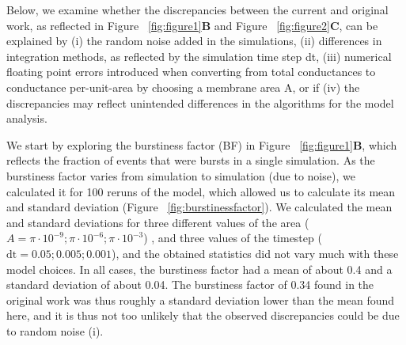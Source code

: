 \documentclass[10pt,a4paper,onecolumn]{article}
\begin{document}
Below, we examine whether the discrepancies between the current and
original work, as reflected in Figure ~\ref{fig:figure1}\textbf{B} and
Figure ~\ref{fig:figure2}\textbf{C}, can be explained by (i) the random
noise added in the simulations, (ii) differences in integration methods,
as reflected by the simulation time step dt, (iii) numerical floating
point errors introduced when converting from total conductances to
conductance per-unit-area by choosing a membrane area A, or if (iv) the
discrepancies may reflect unintended differences in the algorithms for
the model analysis.

We start by exploring the burstiness factor (BF) in Figure
~\ref{fig:figure1}\textbf{B}, which reflects the fraction of events that
were bursts in a single simulation. As the burstiness factor varies from
simulation to simulation (due to noise), we calculated it for 100 reruns
of the model, which allowed us to calculate its mean and standard
deviation (Figure ~\ref{fig:burstinessfactor}). We calculated the mean
and standard deviations for three different values of the area
(\(A = \pi\cdot 10^{-9}; \pi \cdot 10^{-6}; \pi \cdot 10^{-3}\)) , and
three values of the timestep (\(\mathrm{dt} = 0.05; 0.005; 0.001\)), and
the obtained statistics did not vary much with these model choices. In
all cases, the burstiness factor had a mean of about 0.4 and a standard
deviation of about 0.04. The burstiness factor of 0.34 found in the
original work was thus roughly a standard deviation lower than the mean
found here, and it is thus not too unlikely that the observed
discrepancies could be due to random noise (i).
\end{document}
